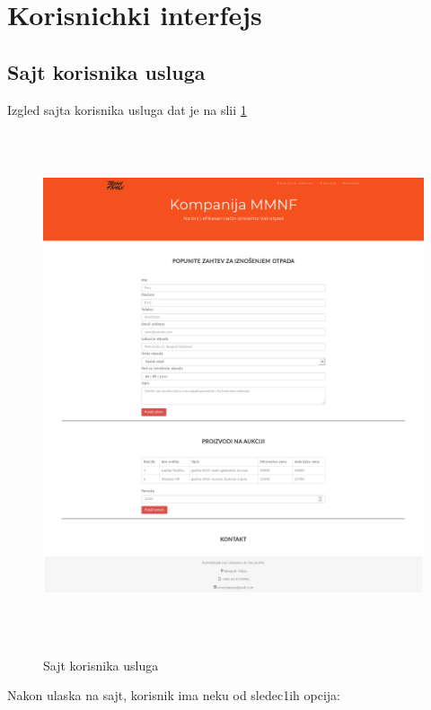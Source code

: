 \documentclass[10 pt]{article}
\begin{document}
	\newpage
	\section{Korisnichki interfejs}
	
	\subsection{Sajt korisnika usluga}
	
	Izgled sajta korisnika usluga dat je na slii \ref{fig:StranaKorisnika}
	
		\begin{figure}[H]
			\centering
			\includegraphics[width=15cm,height=15cm,keepaspectratio]{GUI/stranaKorisnika.png}\\
			\caption{Sajt korisnika usluga}
			\label{fig:StranaKorisnika}
		\end{figure}
	\newpage
	Nakon ulaska na sajt, korisnik ima neku od sledec1ih opcija:
\end{document}
